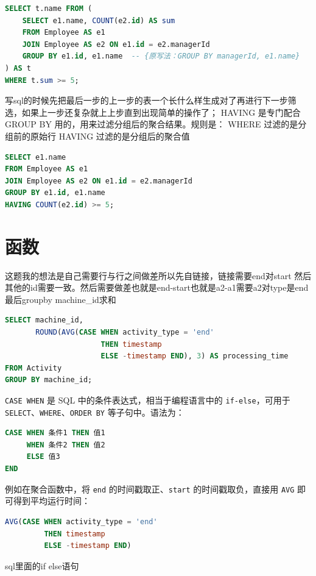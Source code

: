 \begin{homework}[570 | 连接 第8题]
\begin{lstlisting}[language=SQL, frame=single, backgroundcolor=\color{white}]
SELECT t.name FROM (
    SELECT e1.name, COUNT(e2.id) AS sum
    FROM Employee AS e1
    JOIN Employee AS e2 ON e1.id = e2.managerId
    GROUP BY e1.id, e1.name  -- {原写法：GROUP BY managerId, e1.name}
) AS t
WHERE t.sum >= 5;
\end{lstlisting}

\begin{dxtips}
    写sql的时候先把最后一步的上一步的表一个长什么样生成对了再进行下一步筛选，如果上一步还复杂就上上步直到出现简单的操作了；
    HAVING 是专门配合 GROUP BY 用的，用来过滤分组后的聚合结果。规则是：
WHERE 过滤的是分组前的原始行
HAVING 过滤的是分组后的聚合值
\end{dxtips}
\begin{lstlisting}[language=SQL, frame=single, backgroundcolor=\color{white}]
SELECT e1.name
FROM Employee AS e1
JOIN Employee AS e2 ON e1.id = e2.managerId
GROUP BY e1.id, e1.name
HAVING COUNT(e2.id) >= 5;
\end{lstlisting}
\end{homework}

\section{函数}
\begin{homework}[1661 | 连接 第5题]
\begin{dxtips}
    这题我的想法是自己需要行与行之间做差所以先自链接，链接需要end对start 然后其他的id需要一致。然后需要做差也就是end-start也就是a2-a1需要a2对type是end最后groupby machine_id求和
\end{dxtips}
\begin{lstlisting}[language=SQL]
SELECT machine_id,
       ROUND(AVG(CASE WHEN activity_type = 'end'
                      THEN timestamp
                      ELSE -timestamp END), 3) AS processing_time
FROM Activity
GROUP BY machine_id;
\end{lstlisting}
\end{homework}

\begin{note}
\texttt{CASE WHEN} 是 SQL 中的条件表达式，相当于编程语言中的 \texttt{if-else}，可用于 \texttt{SELECT}、\texttt{WHERE}、\texttt{ORDER BY} 等子句中。语法为：
\begin{lstlisting}[language=SQL]
CASE WHEN 条件1 THEN 值1
     WHEN 条件2 THEN 值2
     ELSE 值3
END
\end{lstlisting}
例如在聚合函数中，将 \texttt{end} 的时间戳取正、\texttt{start} 的时间戳取负，直接用 \texttt{AVG} 即可得到平均运行时间：
\begin{lstlisting}[language=SQL]
AVG(CASE WHEN activity_type = 'end'
         THEN timestamp
         ELSE -timestamp END)
\end{lstlisting}
\end{note}
\begin{dxtips}
    sql里面的if else语句
\end{dxtips}

